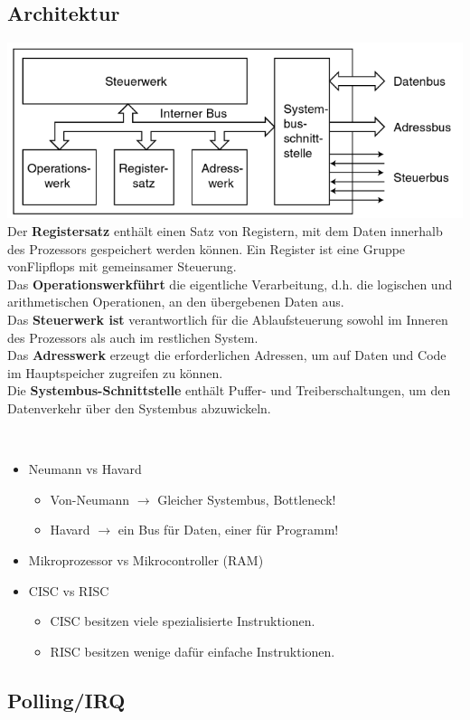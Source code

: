 \subsection{Architektur}
\includegraphics[width=\columnwidth]{Images/Blockschema}
Der \textbf{Registersatz} enthält einen Satz von Registern,  mit dem Daten innerhalb des Prozessors  gespeichert  werden  können.   Ein  Register  ist  eine  Gruppe  vonFlipflops mit gemeinsamer Steuerung.\\
Das \textbf{Operationswerkführt}  die  eigentliche  Verarbeitung,  d.h.   die  logischen  und arithmetischen Operationen, an den übergebenen Daten aus.\\
Das \textbf{Steuerwerk ist} verantwortlich für die Ablaufsteuerung sowohl im Inneren des Prozessors als auch im restlichen System.\\
Das \textbf{Adresswerk} erzeugt die erforderlichen Adressen, um auf Daten und Code im Hauptspeicher zugreifen zu können.\\
Die \textbf{Systembus-Schnittstelle} enthält Puffer- und Treiberschaltungen, um den Datenverkehr über den Systembus abzuwickeln.

~\\
\begin{itemize}[nosep]
	\item Neumann vs Havard
		\begin{itemize}[nosep]
			\item Von-Neumann $\rightarrow$ Gleicher Systembus, Bottleneck!
			\item Havard $\rightarrow$ ein Bus für Daten, einer für Programm!
		\end{itemize}
	\item Mikroprozessor vs Mikrocontroller (RAM)
\end{itemize}

\begin{itemize}[nosep]
	\item CISC vs RISC
	\begin{itemize}[nosep]
		\item CISC besitzen viele spezialisierte Instruktionen.
		\item RISC besitzen wenige dafür einfache Instruktionen.
	\end{itemize}
\end{itemize}

\subsection{Polling/IRQ}
